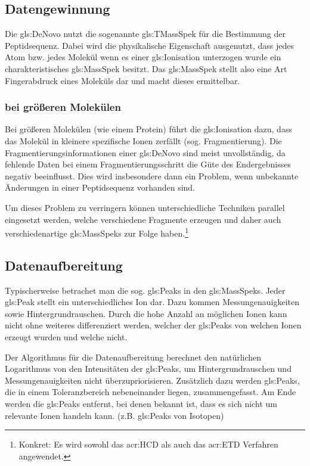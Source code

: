 \documentclass[a4paper, 12pt]{article}
\newcommand{\gerquot}[1]{\glqq#1\grqq}
\newcommand{\dashAndSpace}{\textendash \space}
\begin{document}
\subsection{Datengewinnung}
Die \gls{gls:DeNovo} nutzt die sogenannte \gls{gls:TMassSpek} für die Bestimmung der Peptidsequenz. Dabei wird die physikalische Eigenschaft ausgenutzt, dass jedes Atom bzw. jedes Molekül \dashAndSpace wenn es einer \gls{gls:Ionisation} unterzogen wurde \dashAndSpace ein charakteristisches \gls{gls:MassSpek} besitzt. Das \gls{gls:MassSpek} stellt also eine Art \gerquot{Fingerabdruck} eines Moleküls dar und macht dieses ermittelbar.


\subsubsection{ bei größeren Molekülen}
Bei größeren Molekülen (wie einem Protein) führt die \gls{gls:Ionisation} dazu, dass das Molekül in kleinere spezifische Ionen zerfällt (sog. Fragmentierung). Die Fragmentierungsinformationen einer \gls{gls:DeNovo} sind meist unvollständig, da fehlende Daten bei einem Fragmentierungsschritt die Güte des Endergebnisses negativ beeinflusst. Dies wird insbesondere dann ein Problem, wenn unbekannte Änderungen in einer Peptidsequenz vorhanden sind.

Um dieses Problem zu verringern können unterschiedliche Techniken parallel eingesetzt werden, welche verschiedene Fragmente erzeugen und daher auch verschiedenartige \glspl{gls:MassSpek} zur Folge haben.\footnote{Konkret: Es wird sowohl das \gls{acr:HCD} als auch das \gls{acr:ETD} Verfahren angewendet.}

\subsection{Datenaufbereitung}
Typischerweise betrachet man die sog. \gerquot{\glspl{gls:Peak}} in den \glspl{gls:MassSpek}. Jeder \gls{gls:Peak} stellt ein unterschiedliches Ion dar. Dazu kommen Messungenauigkeiten sowie Hintergrundrauschen. Durch die hohe Anzahl an möglichen Ionen kann nicht ohne weiteres differenziert werden, welcher der \glspl{gls:Peak} von welchen Ionen erzeugt wurden und welche nicht.

Der Algorithmus für die Datenaufbereitung berechnet den natürlichen Logarithmus von den Intensitäten der \glspl{gls:Peak}, um Hintergrundrauschen und Messungenauigkeiten nicht überzupriorisieren. Zusätzlich dazu werden \glspl{gls:Peak}, die in einem Toleranzbereich nebeneinander liegen, zusammengefasst. Am Ende werden die \glspl{gls:Peak} entfernt, bei denen bekannt ist, dass es sich nicht um relevante Ionen handeln kann. (z.B. \glspl{gls:Peak} von Isotopen)
\end{document}
